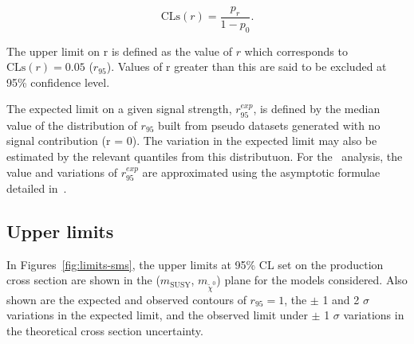 \begin{equation}
\text{CLs}(r) = \frac{p_r}{1-p_0}.
\end{equation}

The upper limit on r is defined as the value of $r$ which corresponds to 
$\text{CLs}(r) = 0.05$ ($r_{95}$). Values of r greater than this are said to be excluded at 95\%
confidence level.

The expected limit on a given signal strength, $r_{95}^{exp}$, is defined by the median value of the distribution
of $r_{95}$ built from pseudo datasets generated with no signal contribution (r = 0). The variation in the 
expected limit may also be estimated by the relevant quantiles from this distributuon.
For the \alphat~analysis, the value and variations of $r_{95}^{exp}$ are approximated using 
the asymptotic formulae detailed in~\cite{asymp}.

\subsection{Upper limits}

In Figures~\ref{fig:limits-sms}, the upper limits at 95\% CL set on the production cross section are shown
in the ($m_{\text{SUSY}}$, $m_{\tilde{\chi}^{0}}$) plane for the models considered.
Also shown are the expected and observed contours of $r_{95} = 1$, the $\pm$ 1 and 2
$\sigma$ variations in the expected limit, and the observed limit under $\pm$ 1 $\sigma$ 
variations in the theoretical cross section uncertainty.

